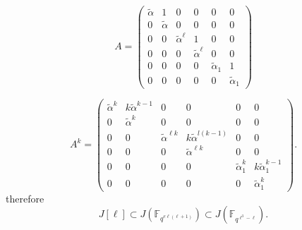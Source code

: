 \documentclass[11pt,a4paper]{article}
\theoremstyle{plain}
\theoremstyle{definition}
\theoremstyle{remark}
\begin{document}
\[
 A =
\begin{pmatrix}
\tilde{\alpha} & 1 & 0 & 0 & 0 & 0\\
0 & \tilde{\alpha} & 0 & 0 & 0 & 0\\
0 & 0 & \tilde{\alpha}^\ell & 1 & 0 & 0\\
0 & 0 & 0 & \tilde{\alpha}^{\ell} & 0 & 0\\
0 & 0 & 0 & 0 & \tilde{\alpha}_1 & 1\\
0 & 0 & 0 & 0 & 0 & \tilde{\alpha}_1
\end{pmatrix}
\]

\[
A^k =
\begin{pmatrix}
\tilde{\alpha}^{k} & k\tilde{\alpha}^{k-1} & 0 & 0 & 0 & 0\\
0 & \tilde{\alpha}^{k} & 0 & 0 & 0 & 0\\
0 & 0 & \tilde{\alpha}^{\ell k} & k\tilde{\alpha}^{l(k-1)} & 0 & 0\\
0 & 0 & 0 & \tilde{\alpha}^{\ell k} & 0 & 0\\
0 & 0 & 0 & 0 & \tilde{\alpha}_1^{k} & k\tilde{\alpha}_1^{k-1}\\
0 & 0 & 0 & 0 & 0 & \tilde{\alpha}_1^{k}
\end{pmatrix}.
\]
therefore
\[
J[\ell] \subset J(\mathbb{F}_{q^{e\ell(\ell+1)}}) \subset J(\mathbb{F}_{q^{\ell^3-\ell}}) .
\]
\end{document}
